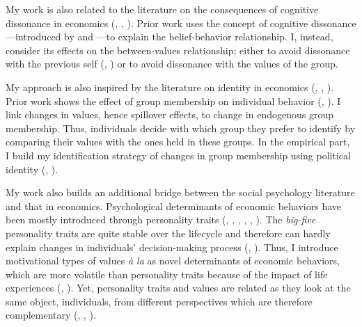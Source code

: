 My work is also related to the literature on the consequences of cognitive dissonance in economics (\citealt{Akerlof1982Cognitive}, \citealt{Konow2000Fair}, \citealt{Benabou2006Belief}).
Prior work uses the concept of cognitive dissonance---introduced by \citet{Festinger1957Theory} and \citet{McGuire1960Cognitive}---to explain the belief-behavior relationship. I, instead, consider its effects on the between-values relationship; either to avoid dissonance with the previous self (\citealt{Eyster2002Rationalizing}, \citealt{Yariv2002See}) or to avoid dissonance with the values of the group.

My approach is also inspired by the literature on identity in economics (\citealt{Akerlof2005Identity, Akerlof2010Identity}, \citealt{Benabou2011Identity}, \citealt{Kranton2016Identity}). Prior work shows the effect of group membership on individual behavior (\citealt{Charness2007Individual}, \citealt{Sutter2009Individual}). I link changes in values, hence spillover effects, to change in endogenous group membership. Thus, individuals decide with which group they prefer to identify by comparing their values with the ones held in these groups.
In the empirical part, I build my identification strategy of changes in group membership using political identity (\citealt{Shayo2009Model}, \citealt{Bonomi2021Identity}).

My work also builds an additional bridge between the social psychology literature and that in economics. Psychological determinants of economic behaviors have been mostly introduced through personality traits (\citealt{Borghans2008Economics}, \citealt{Almlund2011Personality}, \citealt{Ferguson2011Personality}, \citealt{Becker2012Relationship}, \citealt{Flinn2018Personality}, \citealt{Todd2020Dynamic}). 
The \textit{big-five} personality traits are quite stable over the lifecycle and therefore can hardly explain changes in individuals' decision-making process (\citealt{Terracciano2006Personality, Terracciano2010Intra}, \citealt{Cobb-Clark2012Stability}). Thus, I introduce motivational types of values \textit{à la} \citet{Schwartz1992Universals, Schwartz2012Overview} as novel determinants of economic behaviors, which are more volatile than personality traits because of the impact of life experiences (\citealt{Lonnqvist2011Personal}, \citealt{Daniel2021Changes}).
Yet, personality traits and values are related as they look at the same object, individuals, from different perspectives which are therefore complementary (\citealt{Caprara2009Mediational}, \citealt{Fischer2015Motivational}, \citealt{Parks2015Personality}).


